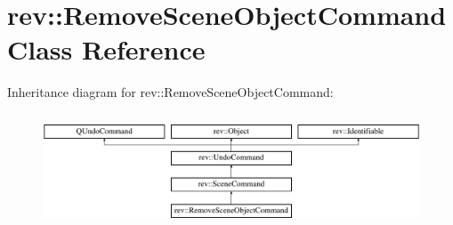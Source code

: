 \hypertarget{classrev_1_1_remove_scene_object_command}{}\section{rev\+::Remove\+Scene\+Object\+Command Class Reference}
\label{classrev_1_1_remove_scene_object_command}
Inheritance diagram for rev\+::Remove\+Scene\+Object\+Command\+:\begin{figure}[H]
\begin{center}
\leavevmode
\includegraphics[height=3.425076cm]{classrev_1_1_remove_scene_object_command}
\end{center}
\end{figure}
